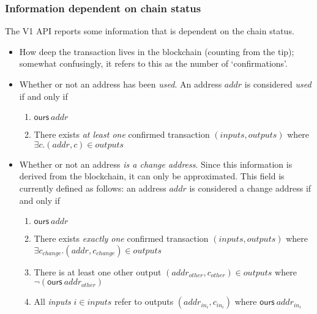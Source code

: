 \documentclass{article}
\theoremstyle{definition}{
  \newtheorem{lemma}{Lemma}[section] %
  \newtheorem{definition}[lemma]{Definition}
}
\theoremstyle{theorem}{
  \newtheorem{invariant}[lemma]{Invariant}
  \newtheorem{proofobligation}[lemma]{Proof Obligation}
}
\numberwithin{equation}{lemma}
\begin{document}
\subsubsection{Information dependent on chain status}
\label{sec:confirmations}

The V1 API reports some information that is dependent on the chain status.

\begin{itemize}
\item How deep the transaction lives in the blockchain (counting from the tip);
somewhat confusingly, it refers to this as the number of `confirmations'.
\item Whether or not an address has been \emph{used}. An address
$\mathit{addr}$ is considered \emph{used} if and only if
\begin{enumerate}
  \item $\mathsf{ours} ~ \mathit{addr}$
  \item There exists \emph{at least one} confirmed transaction $(\mathit{inputs}, \mathit{outputs})$ where $\exists c. (\mathit{addr}, c) \in \mathit{outputs}$
\end{enumerate}
\item Whether or not an address \emph{is a change address}. Since this
information is derived from the blockchain, it can only be approximated. This
field is currently defined as follows: an address $\mathit{addr}$ is considered
a change address if and only if
\begin{enumerate}
  \item $\mathsf{ours} ~ \mathit{addr}$
  \item There exists \emph{exactly one} confirmed transaction $(\mathit{inputs},
  \mathit{outputs})$ where $\exists c_\mathit{change}. (\mathit{addr}, c_\mathit{change}) \in \mathit{outputs}$
  \item There is at least one other output $(\mathit{addr}_\mathit{other}, c_\mathit{other}) \in \mathit{outputs}$ where $\neg (\mathsf{ours} ~ \mathit{addr}_\mathit{other})$
  \item All \emph{inputs} $i \in \mathit{inputs}$ refer to outputs $(\mathit{addr}_{\mathit{in}_i}, c_{\mathit{in}_i})$ where $\mathsf{ours} ~ \mathit{addr}_{\mathit{in}_i}$
\end{enumerate}
\end{itemize}
\end{document}
